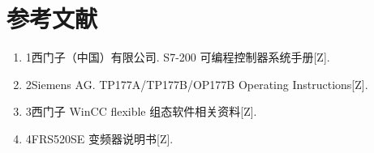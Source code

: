 \documentclass[12pt,a4paper]{ctexart}
\begin{document}
\section*{参考文献}
\begin{enumerate}
\item 1西门子（中国）有限公司. S7-200 可编程控制器系统手册[Z].
\item 2Siemens AG. TP177A/TP177B/OP177B Operating Instructions[Z].
\item 3西门子 WinCC flexible 组态软件相关资料[Z].
\item 4FRS520SE 变频器说明书[Z].
\end{enumerate}
\end{document}
